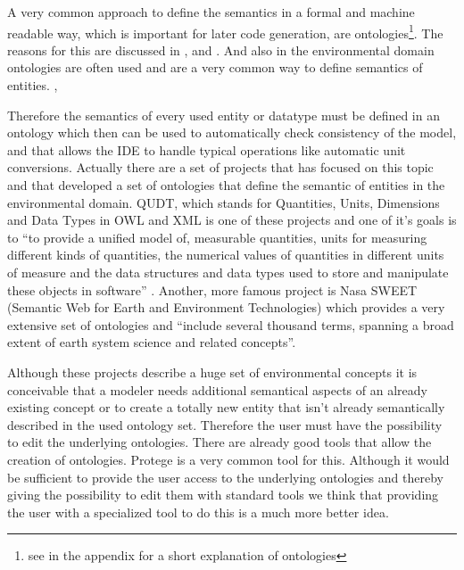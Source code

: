 A very common approach to define the semantics in a formal and machine readable way, which is important for later code generation, are ontologies\footnote{see  in the appendix for a short explanation of ontologies}. The reasons for this are discussed in \autocite{toolchain:protege_onto}, \autocite{toolchain:gruber} and \autocite{toolchain:musen}. And also in the environmental domain ontologies are often used and are a very common way to define semantics of entities. \autocite{dsl:muetzelfeldt}, \autocite{Villa2009577}


Therefore the semantics of every used entity or datatype must be defined in an ontology which then can be used to automatically check consistency of the model, and that allows the IDE to handle typical operations like automatic unit conversions. Actually there are a set of projects that has focused on this topic  and that developed a set of ontologies that define the semantic of entities in the environmental domain.  QUDT, which stands for Quantities, Units, Dimensions and Data Types in OWL and XML \autocite{toolchain:qudt} is one of these projects and one of it’s goals is to ``to provide a unified model of, measurable quantities, units for measuring different kinds of quantities, the numerical values of quantities in different units of measure and the data structures and data types used to store and manipulate these objects in software'' \autocite{toolchain:qudt}. Another, more famous project is Nasa SWEET (Semantic Web for Earth and Environment Technologies) \autocite{toolchain:nasa_sweet} which provides a very extensive set of ontologies and ``include several thousand terms, spanning a broad extent of earth system science and related concepts''\autocite{nasa_sweet_guide}.


Although these projects describe a huge set of environmental concepts it is conceivable that a modeler needs additional semantical aspects of an already existing concept or to create a totally new entity that isn’t already semantically described in the used ontology set. Therefore the user must have the possibility to edit the underlying ontologies.  There are already good tools that allow the creation of ontologies. Protege \autocite{dsl:protege} is a very common tool for this. Although it would be sufficient to provide the user access to the underlying ontologies and thereby giving  the possibility to edit them with standard tools we think that providing the user with a specialized tool to do this is a much more better idea.


